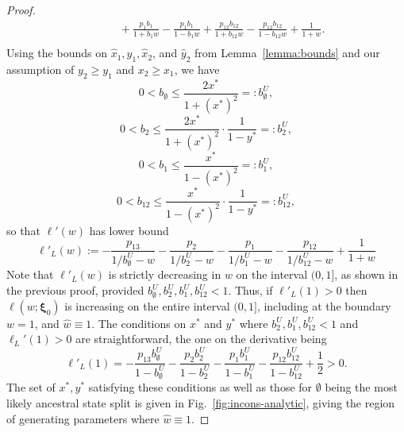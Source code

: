 \begin{proof}
\begin{align*}
         &\qquad + \frac{p_{1}b_{1}}{1 + b_{1}w} - \frac{p_{1}b_{1}}{1 - b_{1}w} + \frac{p_{12}b_{12}}{1 + b_{12}w} - \frac{p_{12}b_{12}}{1 - b_{12}w} + \frac{1}{1+w}.\\
\end{align*}
Using the bounds on $\hat{x}_1,\hat{y}_1,\hat{x}_2$, and $\hat{y}_2$ from Lemma~\ref{lemma:bounds} and our assumption of $y_2 \ge y_1$ and $x_2 \ge x_1$, we have
\[
0 < b_{\emptyset} \le \frac{2x^*}{1+(x^*)^2} =: b_{\emptyset}^U,
\]
\[
0 < b_{2} \le \frac{2x^*}{1+(x^*)^2}\cdot\frac{1}{1-y^*} =: b_{2}^U,
\]
\[
0 < b_{1} \le \frac{x^*}{1-(x^*)^2} =: b_{1}^U,
\]
\[
0 < b_{12} \le \frac{x^*}{1-(x^*)^2}\cdot\frac{1}{1-y^*} =: b_{12}^U,
\]
so that $\ell'(w)$ has lower bound
\[
\ell'_{L}(w) :=  -\frac{p_{13}}{1/b_{\emptyset}^U - w} - \frac{p_{2}}{1/b_{2}^U - w} - \frac{p_{1}}{1/b_{1}^U - w} - \frac{p_{12}}{1/b_{12}^U - w} + \frac{1}{1+w}
\]
Note that $\ell'_{L}(w)$ is strictly decreasing in $w$ on the interval $(0,1]$, as shown in the previous proof, provided $b_{\emptyset}^U, b_{2}^U, b_{1}^U, b_{12}^U < 1$.
Thus, if $\ell'_{L}(1) > 0$ then $\ell(w; \boldsymbol\xi_0)$ is increasing on the entire interval $(0,1]$, including at the boundary $w=1$, and $\hat{w} \equiv 1$.
The conditions on $x^*$ and $y^*$ where $b_{2}^U, b_{1}^U, b_{12}^U < 1$ and $\ell_L'(1) > 0$ are straightforward, the one on the derivative being
\[
\ell'_{L}(1) =  -\frac{p_{13}b_{\emptyset}^U}{1-b_{\emptyset}^U} - \frac{p_{2}b_{2}^U}{1-b_{2}^U} - \frac{p_{1}b_{1}^U}{1-b_{1}^U} - \frac{p_{12}b_{12}^U}{1-b_{12}^U} + \frac{1}{2} > 0.
\]
The set of $x^*,y^*$ satisfying these conditions as well as those for $\emptyset$ being the most likely ancestral state split is given in Fig.~\ref{fig:incons-analytic}, giving the region of generating parameters where $\hat{w}\equiv 1$.
\end{proof}

